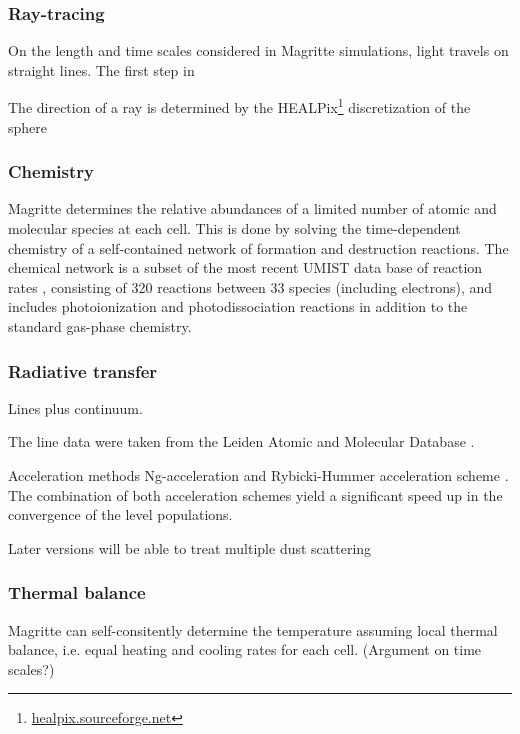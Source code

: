 \documentclass[a4paper,fleqn,usenatbib]{mnras}
\begin{document}
\subsubsection{Ray-tracing}

On the length and time scales considered in Magritte simulations, light travels on straight lines. The first step in

The direction of a ray is determined by the HEALPix\footnote{\href{http://healpix.sourceforge.net}{healpix.sourceforge.net}} discretization of the sphere \citet{Gorski2005}

\subsubsection{Chemistry}

Magritte determines the relative abundances of a limited number of atomic and molecular species at each cell. This is done by solving the time-dependent chemistry of a self-contained network of formation and destruction reactions. The chemical network is a subset of the most recent UMIST data base of reaction rates \citet{Woodall2007}, consisting of 320 reactions between 33 species (including electrons), and includes photoionization and photodissociation reactions in addition to the standard gas-phase chemistry.

\subsubsection{Radiative transfer}

Lines plus continuum.

The line data were taken from the Leiden Atomic and Molecular Database \citep[LAMDA,][]{Schoier2005}.

Acceleration methods Ng-acceleration \citet{Ng1974} and Rybicki-Hummer acceleration scheme \citet{Rybicki1991}. The combination of both acceleration schemes yield a significant speed up in the convergence of the level populations.

Later versions will be able to treat multiple dust scattering

\subsubsection{Thermal balance}

Magritte can self-consitently determine the temperature assuming local thermal balance, i.e. equal heating and cooling rates for each cell. (Argument on time scales?)
\end{document}
